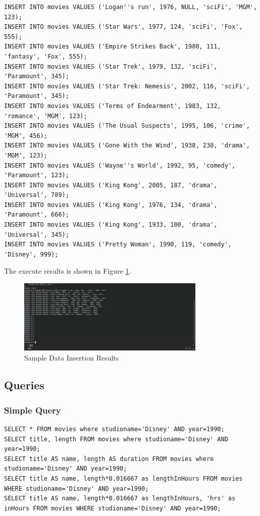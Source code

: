 \documentclass{cshwk}
\begin{document}
\begin{lstlisting}
INSERT INTO movies VALUES ('Logan''s run', 1976, NULL, 'sciFi', 'MGM', 123);
INSERT INTO movies VALUES ('Star Wars', 1977, 124, 'sciFi', 'Fox', 555);
INSERT INTO movies VALUES ('Empire Strikes Back', 1980, 111, 'fantasy', 'Fox', 555);
INSERT INTO movies VALUES ('Star Trek', 1979, 132, 'sciFi', 'Paramount', 345);
INSERT INTO movies VALUES ('Star Trek: Nemesis', 2002, 116, 'sciFi', 'Paramount', 345);
INSERT INTO movies VALUES ('Terms of Endearment', 1983, 132, 'romance', 'MGM', 123);
INSERT INTO movies VALUES ('The Usual Suspects', 1995, 106, 'crime', 'MGM', 456);
INSERT INTO movies VALUES ('Gone With the Wind', 1938, 238, 'drama', 'MGM', 123);
INSERT INTO movies VALUES ('Wayne''s World', 1992, 95, 'comedy', 'Paramount', 123);
INSERT INTO movies VALUES ('King Kong', 2005, 187, 'drama', 'Universal', 789);
INSERT INTO movies VALUES ('King Kong', 1976, 134, 'drama', 'Paramount', 666);
INSERT INTO movies VALUES ('King Kong', 1933, 100, 'drama', 'Universal', 345);
INSERT INTO movies VALUES ('Pretty Woman', 1990, 119, 'comedy', 'Disney', 999);
\end{lstlisting}

The execute results is shown in Figure \ref{fig:sample-data}.
\begin{figure}[htbp]
    \centering
    \includegraphics[width=0.8\textwidth]{hw4-2.png}
    \caption{Sample Data Insertion Results}
    \label{fig:sample-data}
\end{figure}

\subsection{Queries}

\subsubsection{Simple Query}

\begin{lstlisting}
SELECT * FROM movies where studioname='Disney' AND year=1990;
SELECT title, length FROM movies where studioname='Disney' AND year=1990;
SELECT title AS name, length AS duration FROM movies where studioname='Disney' AND year=1990;
SELECT title AS name, length*0.016667 as lengthInHours FROM movies WHERE studioname='Disney' AND year=1990;
SELECT title AS name, length*0.016667 as lengthInHours, 'hrs' as inHours FROM movies WHERE studioname='Disney' AND year=1990;
\end{lstlisting}
\end{document}
